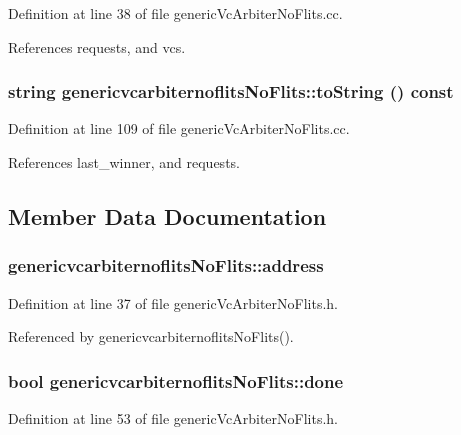 Definition at line 38 of file genericVcArbiterNoFlits.cc.

References requests, and vcs.
\subsubsection[{toString}]{\setlength{\rightskip}{0pt plus 5cm}string genericvcarbiternoflitsNoFlits::toString () const}\label{classgenericvcarbiternoflitsNoFlits_0cbe88bbc52325a3f4301bcca576e2ea}




Definition at line 109 of file genericVcArbiterNoFlits.cc.

References last\_\-winner, and requests.

\subsection{Member Data Documentation}
\subsubsection[{address}]{ {\bf genericvcarbiternoflitsNoFlits::address}}\label{classgenericvcarbiternoflitsNoFlits_5160d84b65185cfc3d7942ebb186982c}




Definition at line 37 of file genericVcArbiterNoFlits.h.

Referenced by genericvcarbiternoflitsNoFlits().
\subsubsection[{done}]{\setlength{\rightskip}{0pt plus 5cm}bool {\bf genericvcarbiternoflitsNoFlits::done}\hspace{0.3cm}{\tt  [private]}}\label{classgenericvcarbiternoflitsNoFlits_27235d72b4988b915f86484bf9d9f129}




Definition at line 53 of file genericVcArbiterNoFlits.h.

